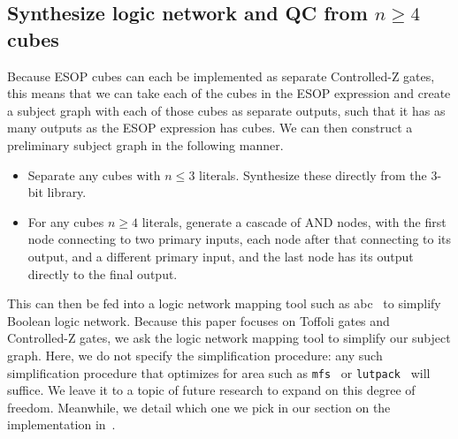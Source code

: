 

\subsection{Synthesize logic network and QC from $n \geq 4$ cubes}
\label{Pro:n4}

Because ESOP cubes can each be implemented as separate Controlled-Z gates, this
means that we can take each of the cubes in the ESOP expression and create a subject
graph with each of those cubes as separate outputs, such that it has as many
outputs as the ESOP expression has cubes. We can then construct a preliminary subject
graph in the following manner.

\begin{itemize}
\item Separate any cubes with $n \leq 3$ literals. Synthesize these directly from the 3-bit library.
\item For any cubes $n \geq 4$ literals, generate a cascade of AND nodes, with the first node connecting
  to two primary inputs, each node after that connecting to its output, and a different primary input,
  and the last node has its output directly to the final output.
\end{itemize}

This can then be fed into a logic network mapping tool such as abc~\cite{bib-mishchenko-lut} to
simplify Boolean logic network. Because this paper focuses on Toffoli gates and Controlled-Z gates,
we ask the logic network mapping tool to simplify our subject graph. Here, we do not specify
the simplification procedure: any such simplification procedure that optimizes for area such as
\texttt{mfs}~\cite{bib-mishchenko-mfs} or \texttt{lutpack}~\cite{bib-mishchenko-lutpack} will suffice.
We leave it to a topic of future research to expand on this degree of freedom. Meanwhile, we detail
which one we pick in our section on the implementation in~.

